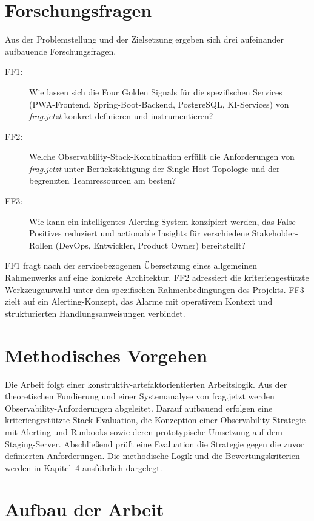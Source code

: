 \section{Forschungsfragen}
\label{sec:forschungsfragen}

Aus der Problemstellung und der Zielsetzung ergeben sich drei aufeinander aufbauende Forschungsfragen.

\begin{description}
  \item[FF1:] Wie lassen sich die Four Golden Signals für die spezifischen Services (PWA-Frontend, Spring-Boot-Backend, PostgreSQL, KI-Services) von \emph{frag.jetzt} konkret definieren und instrumentieren?
  \item[FF2:] Welche Observability-Stack-Kombination erfüllt die Anforderungen von \emph{frag.jetzt} unter Berücksichtigung der Single-Host-Topologie und der begrenzten Teamressourcen am besten?
  \item[FF3:] Wie kann ein intelligentes Alerting-System konzipiert werden, das False Positives reduziert und actionable Insights für verschiedene Stakeholder-Rollen (DevOps, Entwickler, Product Owner) bereitstellt?
\end{description}

FF1 fragt nach der servicebezogenen Übersetzung eines allgemeinen Rahmenwerks auf eine konkrete Architektur. FF2 adressiert die kriteriengestützte Werkzeugauswahl unter den spezifischen Rahmenbedingungen des Projekts. FF3 zielt auf ein Alerting-Konzept, das Alarme mit operativem Kontext und strukturierten Handlungsanweisungen verbindet.


\section{Methodisches Vorgehen}
\label{sec:methodik-kurzfassung}

Die Arbeit folgt einer konstruktiv-artefaktorientierten Arbeitslogik. Aus der theoretischen Fundierung und einer Systemanalyse von frag.jetzt werden Observability-Anforderungen abgeleitet. Darauf aufbauend erfolgen eine kriteriengestützte Stack-Evaluation, die Konzeption einer Observability-Strategie mit Alerting und Runbooks sowie deren prototypische Umsetzung auf dem Staging-Server. Abschließend prüft eine Evaluation die Strategie gegen die zuvor definierten Anforderungen. Die methodische Logik und die Bewertungskriterien werden in Kapitel~4 ausführlich dargelegt.


\section{Aufbau der Arbeit}
\label{sec:aufbau}

